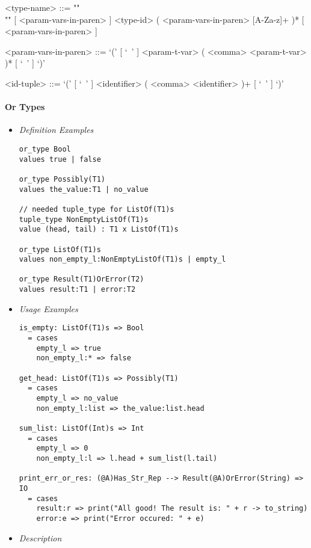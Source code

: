 \documentclass{article}
\begin{document}
\begin{itemize}
\begin{grammar}
<type-name> ::= ""\\""
[ <param-vars-in-paren> ] <type-id> ( <param-vars-in-paren> [A-Za-z]+ )*
[ <param-vars-in-paren> ]

<param-vars-in-paren> ::=
`(' [ `\ ' ] <param-t-var> ( <comma> <param-t-var> )* [ `\ ' ] `)'

<id-tuple> ::= `(' [ `\ ' ] <identifier> ( <comma> <identifier> )+ [ `\ ' ] `)'
\end{grammar}

\end{itemize}

\paragraph{Or Types}

\begin{itemize}
\item \textit{Definition Examples}

\begin{verbatim}
or_type Bool
values true | false

or_type Possibly(T1)
values the_value:T1 | no_value

// needed tuple_type for ListOf(T1)s
tuple_type NonEmptyListOf(T1)s
value (head, tail) : T1 x ListOf(T1)s

or_type ListOf(T1)s
values non_empty_l:NonEmptyListOf(T1)s | empty_l

or_type Result(T1)OrError(T2)
values result:T1 | error:T2
\end{verbatim}

\item \textit{Usage Examples}

\begin{verbatim}
is_empty: ListOf(T1)s => Bool
  = cases
    empty_l => true
    non_empty_l:* => false

get_head: ListOf(T1)s => Possibly(T1)
  = cases
    empty_l => no_value
    non_empty_l:list => the_value:list.head

sum_list: ListOf(Int)s => Int
  = cases
    empty_l => 0
    non_empty_l:l => l.head + sum_list(l.tail)

print_err_or_res: (@A)Has_Str_Rep --> Result(@A)OrError(String) => IO
  = cases
    result:r => print("All good! The result is: " + r -> to_string)
    error:e => print("Error occured: " + e)
\end{verbatim}

\item \textit{Description}


\end{itemize}
\end{document}
